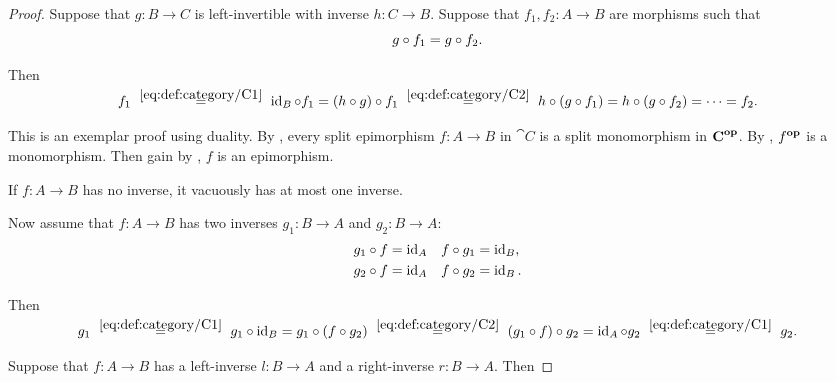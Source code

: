 \begin{proof}
   Suppose that \( g: B \to C \) is left-invertible with inverse \( h: C \to B \). Suppose that \( f_1, f_2: A \to B \) are morphisms such that
  \begin{equation*}
    g \bincirc f_1 = g \bincirc f_2.
  \end{equation*}

  Then
  \begin{equation*}
    f_1
    \reloset {\eqref{eq:def:category/C1}} =
    \id_B \bincirc f_1
    =
    (h \bincirc g) \bincirc f_1
    \reloset {\eqref{eq:def:category/C2}} =
    h \bincirc (g \bincirc f_1)
    =
    h \bincirc (g \bincirc f_2)
    =
    \cdots
    =
    f_2.
  \end{equation*}

   This is an exemplar proof using duality. By , every split epimorphism \( f: A \to B \) in \( \cat{C} \) is a split monomorphism in \( \cat{C}^\oppos \). By , \( f^\oppos \) is a monomorphism. Then gain by , \( f \) is an epimorphism.

   If \( f: A \to B \) has no inverse, it vacuously has at most one inverse.

  Now assume that \( f: A \to B \) has two inverses \( g_1: B \to A \) and \( g_2: B \to A \):
  \begin{align*}
    g_1 \bincirc f = \id_A &&& f \bincirc g_1 = \id_B, \\
    g_2 \bincirc f = \id_A &&& f \bincirc g_2 = \id_B.
  \end{align*}

  Then
  \begin{equation*}
    g_1
    \reloset {\eqref{eq:def:category/C1}} =
    g_1 \bincirc \id_B
    =
    g_1 \bincirc (f \bincirc g_2)
    \reloset {\eqref{eq:def:category/C2}} =
    (g_1 \bincirc f) \bincirc g_2
    =
    \id_A \bincirc g_2
    \reloset {\eqref{eq:def:category/C1}} =
    g_2.
  \end{equation*}

   Suppose that \( f: A \to B \) has a left-inverse \( l: B \to A \) and a right-inverse \( r: B \to A \). Then


\end{proof}
